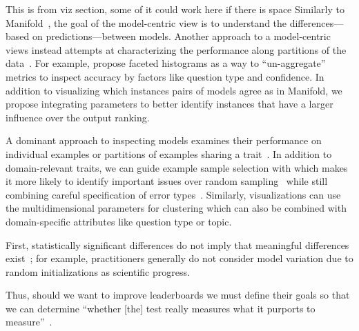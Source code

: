 This is from viz section, some of it could work here if there is space
Similarly to Manifold~\citep{zhang2019manifold}, the goal of the model-centric view is to understand the differences---based on predictions---between models.
Another approach to a model-centric views instead attempts at characterizing the performance along partitions of the data~\citep{liu2018answer}.
For example, \citet{arendt2020crosscheck} propose faceted histograms as a way to ``un-aggregate'' metrics to inspect \qa{} accuracy by factors like question type and confidence.
In addition to visualizing which instances pairs of models agree as in Manifold, we propose integrating \irt{} parameters to better identify instances that have a larger influence over the output ranking.

A dominant approach to inspecting models examines their performance on individual examples or partitions of examples sharing a trait~\citep{wadhwa2018compare}.
In addition to domain-relevant traits, we can guide example sample selection with \irt{} which makes it more likely to identify important issues over random sampling~\citep{wadhwa2018compare} while still combining careful specification of error types~\citep{wu2019errudite}.
Similarly, visualizations can use the multidimensional \irt{} parameters for clustering which can also be combined with domain-specific attributes like question type or topic.


First, statistically significant differences do not imply that meaningful differences exist~\citep{corani2017compare,szymanski2020best}; for example, \nlp{} practitioners generally do not consider model variation due to random initializations as scientific progress.

Thus, should we want to improve leaderboards we must define their goals so that we can determine ``whether [the] test really measures what it purports to measure''~\citep{kelley1927measures}.

